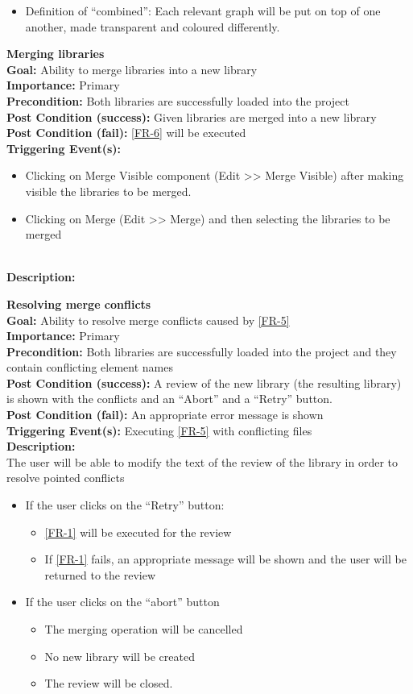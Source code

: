 \documentclass[10pt,a4paper]{report}
\newcommand{\FRDescription}[8]{
    \textbf{#1} \leavevmode \\
    \textbf{Goal: } #2 \leavevmode \\
    \textbf{Importance: } #3 \leavevmode \\
    \textbf{Precondition: } #4 \leavevmode \\
    \textbf{Post Condition (success): } #5 \leavevmode \\
    \textbf{Post Condition (fail): } #6 \leavevmode \\
    \textbf{Triggering Event(s): } #7 \leavevmode \\
    \textbf{Description: } \leavevmode \\ 
    #8}
\begin{document}
\begin{FR}
    {\begin{itemize}
        \item Definition of “combined”: Each relevant graph will be put on top of one another, made transparent and coloured differently.
    \end{itemize}}
    \item \FRDescription{Merging libraries}
    {Ability to merge libraries into a new library}
    {Primary}
    {Both libraries are successfully loaded into the project}
    {Given libraries are merged into a new library}
    {\ref{FR-6} will be executed}
    {\begin{itemize}
        \item Clicking on Merge Visible component (Edit >> Merge Visible) after making visible the libraries to be merged.
        \item Clicking on Merge (Edit >> Merge) and then selecting the libraries to be merged
    \end{itemize}}
    \item \FRDescription{Resolving merge conflicts}
    {Ability to resolve merge conflicts caused by \ref{FR-5}}
    {Primary}
    {Both libraries are successfully loaded into the project and they contain conflicting element names}
    {A review of the new library (the resulting library) is shown with the conflicts and an “Abort” and a “Retry” button.}
    {An appropriate error message is shown}
    {Executing \ref{FR-5} with conflicting files}
    {The user will be able to modify the text of the review of the library in order to resolve pointed conflicts
    \begin{itemize}
        \item If the user clicks on the “Retry” button:
        \begin{itemize}
            \item \ref{FR-1} will be executed for the review
            \item If \ref{FR-1} fails, an appropriate message will be shown and the user will be returned to the review
        \end{itemize}
        \item If the user clicks on the “abort” button
        \begin{itemize}
            \item The merging operation will be cancelled
            \item No new library will be created
            \item The review will be closed.
        \end{itemize}

\end{itemize}}
\end{FR}
\end{document}
